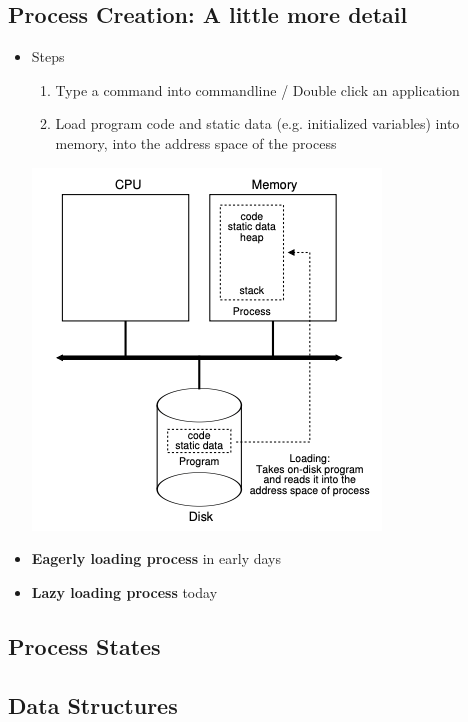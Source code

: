 \documentclass[12pt]{article}
\begin{document}
\subsection{Process Creation: A little more detail}


\begin{itemize}
    \item Steps
    \begin{enumerate}[1.]
        \item Type a command into commandline / Double click an application
        \item Load program code and static data (e.g. initialized variables) into
        memory, into the address space of the process
    \end{enumerate}

    \begin{center}
    \includegraphics[width=0.4\linewidth]{images/notes_4_6.png}
    \end{center}

    \item \textbf{Eagerly loading process} in early days
    \item \textbf{Lazy loading process} today
\end{itemize}
\subsection{Process States}
\subsection{Data Structures}
\end{document}
